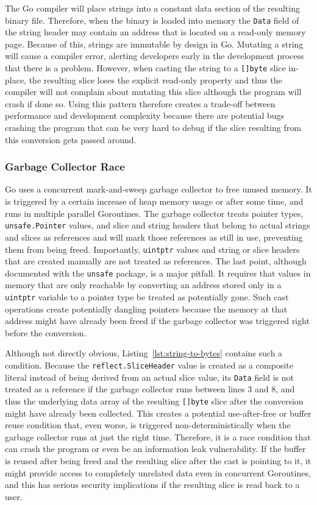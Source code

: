 The Go compiler will place strings into a constant data section of the resulting binary file.
Therefore, when the binary is loaded into memory the \texttt{Data} field of the string header may contain an address that is located on a read-only memory page.
Because of this, strings are immutable by design in Go.
Mutating a string will cause a compiler error, alerting developers early in the development process that there is a problem.
However, when casting the string to a \texttt{[]byte} slice in-place, the resulting slice loses the explicit read-only property and thus the compiler will not complain about mutating this slice although the program will crash if done so.
Using this pattern therefore creates a trade-off between performance and development complexity because there are potential bugs crashing the program that can be very hard to debug if the slice resulting from this conversion gets passed around.


\subsubsection*{Garbage Collector Race}

Go uses a concurrent mark-and-sweep garbage collector to free unused memory.
It is triggered by a certain increase of heap memory usage or after some time, and runs in multiple parallel Goroutines.
The garbage collector treats pointer types, \texttt{unsafe.Pointer} values, and slice and string headers that belong to actual strings and slices as references and will mark those references as still in use, preventing them from being freed.
Importantly, \texttt{uintptr} values and string or slice headers that are created manually are not treated as references.
The last point, although documented with the \texttt{unsafe} package, is a major pitfall.
It requires that values in memory that are only reachable by converting an address stored only in a \texttt{uintptr} variable to a pointer type be treated as potentially gone.
Such cast operations create potentially dangling pointers because the memory at that address might have already been freed if the garbage collector was triggered right before the conversion.

Although not directly obvious, Listing~\ref{lst:string-to-bytes} contains such a condition.
Because the \texttt{reflect.SliceHeader} value is created as a composite literal instead of being derived from an actual slice value, its \texttt{Data} field is not treated as a reference if the garbage collector runs between lines 3 and 8, and thus the underlying data array of the resulting \texttt{[]byte} slice after the conversion might have already been collected.
This creates a potential use-after-free or buffer reuse condition that, even worse, is triggered non-deterministically when the garbage collector runs at just the right time.
Therefore, it is a race condition that can crash the program or even be an information leak vulnerability.
If the buffer is reused after being freed and the resulting slice after the cast is pointing to it, it might provide access to completely unrelated data even in concurrent Goroutines, and this has serious security implications if the resulting slice is read back to a user.

